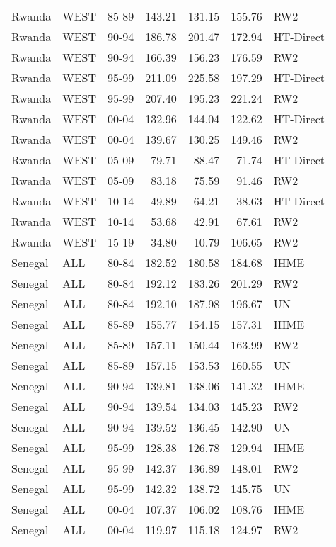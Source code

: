 \begin{longtable}{lllrrrl}
  Rwanda & WEST & 85-89 & 143.21 & 131.15 & 155.76 & RW2 \\ 
  Rwanda & WEST & 90-94 & 186.78 & 201.47 & 172.94 & HT-Direct \\ 
  Rwanda & WEST & 90-94 & 166.39 & 156.23 & 176.59 & RW2 \\ 
  Rwanda & WEST & 95-99 & 211.09 & 225.58 & 197.29 & HT-Direct \\ 
  Rwanda & WEST & 95-99 & 207.40 & 195.23 & 221.24 & RW2 \\ 
  Rwanda & WEST & 00-04 & 132.96 & 144.04 & 122.62 & HT-Direct \\ 
  Rwanda & WEST & 00-04 & 139.67 & 130.25 & 149.46 & RW2 \\ 
  Rwanda & WEST & 05-09 & 79.71 & 88.47 & 71.74 & HT-Direct \\ 
  Rwanda & WEST & 05-09 & 83.18 & 75.59 & 91.46 & RW2 \\ 
  Rwanda & WEST & 10-14 & 49.89 & 64.21 & 38.63 & HT-Direct \\ 
  Rwanda & WEST & 10-14 & 53.68 & 42.91 & 67.61 & RW2 \\ 
  Rwanda & WEST & 15-19 & 34.80 & 10.79 & 106.65 & RW2 \\ 
  Senegal & ALL & 80-84 & 182.52 & 180.58 & 184.68 & IHME \\ 
  Senegal & ALL & 80-84 & 192.12 & 183.26 & 201.29 & RW2 \\ 
  Senegal & ALL & 80-84 & 192.10 & 187.98 & 196.67 & UN \\ 
  Senegal & ALL & 85-89 & 155.77 & 154.15 & 157.31 & IHME \\ 
  Senegal & ALL & 85-89 & 157.11 & 150.44 & 163.99 & RW2 \\ 
  Senegal & ALL & 85-89 & 157.15 & 153.53 & 160.55 & UN \\ 
  Senegal & ALL & 90-94 & 139.81 & 138.06 & 141.32 & IHME \\ 
  Senegal & ALL & 90-94 & 139.54 & 134.03 & 145.23 & RW2 \\ 
  Senegal & ALL & 90-94 & 139.52 & 136.45 & 142.90 & UN \\ 
  Senegal & ALL & 95-99 & 128.38 & 126.78 & 129.94 & IHME \\ 
  Senegal & ALL & 95-99 & 142.37 & 136.89 & 148.01 & RW2 \\ 
  Senegal & ALL & 95-99 & 142.32 & 138.72 & 145.75 & UN \\ 
  Senegal & ALL & 00-04 & 107.37 & 106.02 & 108.76 & IHME \\ 
  Senegal & ALL & 00-04 & 119.97 & 115.18 & 124.97 & RW2 \\ 

\end{longtable}
